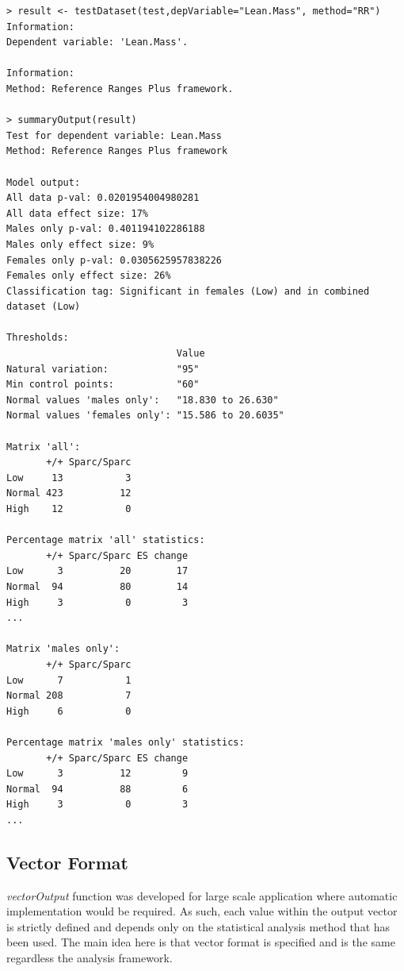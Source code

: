 \documentclass[12pt,a4paper]{article}
\begin{document}
\begingroup
    \fontsize{8pt}{12pt}\selectfont
\begin{verbatim}
> result <- testDataset(test,depVariable="Lean.Mass", method="RR")
Information:
Dependent variable: 'Lean.Mass'.

Information:
Method: Reference Ranges Plus framework.

> summaryOutput(result)
Test for dependent variable: Lean.Mass
Method: Reference Ranges Plus framework

Model output:
All data p-val: 0.0201954004980281
All data effect size: 17%
Males only p-val: 0.401194102286188
Males only effect size: 9%
Females only p-val: 0.0305625957838226
Females only effect size: 26%
Classification tag: Significant in females (Low) and in combined dataset (Low)

Thresholds:
                              Value              
Natural variation:            "95"               
Min control points:           "60"               
Normal values 'males only':   "18.830 to 26.630" 
Normal values 'females only': "15.586 to 20.6035"

Matrix 'all':
       +/+ Sparc/Sparc
Low     13           3
Normal 423          12
High    12           0

Percentage matrix 'all' statistics:
       +/+ Sparc/Sparc ES change
Low      3          20        17
Normal  94          80        14
High     3           0         3
...

Matrix 'males only':
       +/+ Sparc/Sparc
Low      7           1
Normal 208           7
High     6           0

Percentage matrix 'males only' statistics:
       +/+ Sparc/Sparc ES change
Low      3          12         9
Normal  94          88         6
High     3           0         3
...
\end{verbatim}
\endgroup
\subsection{Vector Format}
\textit{vectorOutput} function was developed for large scale application where automatic implementation would be required. 
As such, each value within the output vector is strictly defined and depends only on the statistical analysis method that has been used. 
The main idea here is that vector format is specified and is the same regardless the analysis framework.
\end{document}
